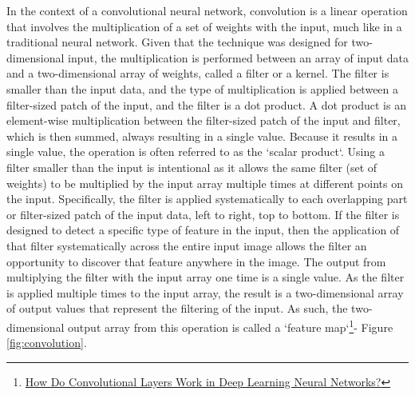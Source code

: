 In the context of a convolutional neural network, convolution is a linear operation that involves the multiplication of a set of weights with the input, much like in a traditional neural network. Given that the technique was designed for two-dimensional input, the multiplication is performed between an array of input data and a two-dimensional array of weights, called a filter or a kernel.
The filter is smaller than the input data, and the type of multiplication is applied between a filter-sized patch of the input, and the filter is a dot product. A dot product is an element-wise multiplication between the filter-sized patch of the input and filter, which is then summed, always resulting in a single value. Because it results in a single value, the operation is often referred to as the `scalar product`.
Using a filter smaller than the input is intentional as it allows the same filter (set of weights) to be multiplied by the input array multiple times at different points on the input. Specifically, the filter is applied systematically to each overlapping part or filter-sized patch of the input data, left to right, top to bottom.
If the filter is designed to detect a specific type of feature in the input, then the application of that filter systematically across the entire input image allows the filter an opportunity to discover that feature anywhere in the image.
The output from multiplying the filter with the input array one time is a single value. As the filter is applied multiple times to the input array, the result is a two-dimensional array of output values that represent the filtering of the input. As such, the two-dimensional output array from this operation is called a `feature map`\footnote{\href{https://machinelearningmastery.com/convolutional-layers-for-deep-learning-neural-networks/}{How Do Convolutional Layers Work in Deep Learning Neural Networks?}}- Figure \ref{fig:convolution}.

